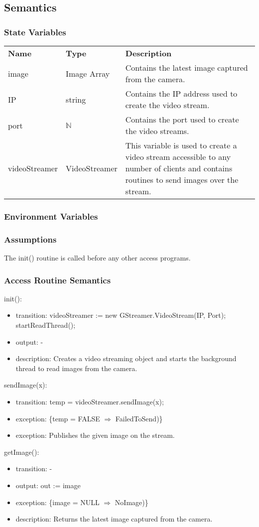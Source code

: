 \documentclass[12pt, titlepage]{article}
\begin{document}
\subsection{Semantics}
\subsubsection{State Variables}
\begin{center}
\begin{tabular}{p{3 cm} p{3cm} p{6.5cm} }
\hline
\textbf{Name} & \textbf{Type} & \textbf{Description}  \\
image & Image Array & Contains the latest image captured from the camera. \\
IP & string & Contains the IP address used to create the video stream. \\
port & $\mathbb{N}$ & Contains the port used to create the video streams. \\
videoStreamer & VideoStreamer & This variable is used to create a video stream accessible to any number of clients and contains routines to send images over the stream.   \\
\hline
\hline
\end{tabular}
\end{center}
\subsubsection{Environment Variables}
\subsubsection{Assumptions}
The init() routine is called before any other access programs.
\subsubsection{Access Routine Semantics}
\noindent init():
\begin{itemize}
\item transition: videoStreamer := new GStreamer.VideoStream(IP, Port); startReadThread();
\item output: -
\item description: Creates a video streaming object and starts the background thread to read images from the camera.
\end{itemize}
\noindent sendImage(x):
\begin{itemize}
\item transition: temp = videoStreamer.sendImage(x);
\item exception: \{temp = FALSE $\Rightarrow$ FailedToSend)\}
\item exception: Publishes the given image on the stream.  
\end{itemize}
\noindent getImage():
\begin{itemize}
\item transition: -
\item output: out := image 
\item exception: \{image = NULL $\Rightarrow$ NoImage)\}
\item description: Returns the latest image captured from the camera. 
\end{itemize}
\end{document}
